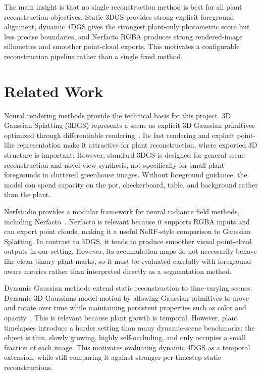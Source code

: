 \documentclass[sigconf]{acmart}
\begin{document}
The main insight is that no single reconstruction method is best for all plant reconstruction objectives. Static 3DGS provides strong explicit foreground alignment, dynamic 4DGS gives the strongest plant-only photometric score but less precise boundaries, and Nerfacto RGBA produces strong rendered-image silhouettes and smoother point-cloud exports. This motivates a configurable reconstruction pipeline rather than a single fixed method.


\section{Related Work}
Neural rendering methods provide the technical basis for this project. 3D Gaussian Splatting (3DGS) represents a scene as explicit 3D Gaussian primitives optimized through differentiable rendering~\cite{kerbl20233dgaussians}. Its fast rendering and explicit point-like representation make it attractive for plant reconstruction, where exported 3D structure is important. However, standard 3DGS is designed for general scene reconstruction and novel-view synthesis, not specifically for small plant foregrounds in cluttered greenhouse images. Without foreground guidance, the model can spend capacity on the pot, checkerboard, table, and background rather than the plant.

Nerfstudio provides a modular framework for neural radiance field methods, including Nerfacto~\cite{nerfstudio}. Nerfacto is relevant because it supports RGBA inputs and can export point clouds, making it a useful NeRF-style comparison to Gaussian Splatting. In contrast to 3DGS, it tends to produce smoother visual point-cloud outputs in our setting. However, its accumulation maps do not necessarily behave like clean binary plant masks, so it must be evaluated carefully with foreground-aware metrics rather than interpreted directly as a segmentation method.

Dynamic Gaussian methods extend static reconstruction to time-varying scenes. Dynamic 3D Gaussians model motion by allowing Gaussian primitives to move and rotate over time while maintaining persistent properties such as color and opacity~\cite{luiten2024dynamic3dgaussians}. This is relevant because plant growth is temporal. However, plant timelapses introduce a harder setting than many dynamic-scene benchmarks: the object is thin, slowly growing, highly self-occluding, and only occupies a small fraction of each image. This motivates evaluating dynamic 4DGS as a temporal extension, while still comparing it against stronger per-timestep static reconstructions.
\end{document}
